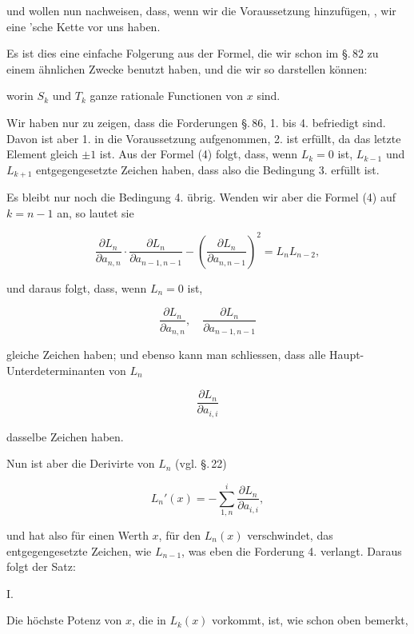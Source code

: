 und wollen nun nachweisen, dass, wenn wir die Voraussetzung hinzufügen, , wir eine 'sche Kette vor uns haben.

Es ist dies eine einfache Folgerung aus der Formel, die wir schon im \S.\,82 zu einem ähnlichen Zwecke benutzt haben, und die wir so darstellen können:


worin $S_k$ und $T_k$ ganze rationale Functionen von $x$ sind.

Wir haben nur zu zeigen, dass die Forderungen \S.\,86, 1. bis 4. befriedigt sind. Davon ist aber 1. in die Voraussetzung aufgenommen, 2. ist erfüllt, da das letzte Element gleich $\pm 1$ ist. Aus der Formel (4) folgt, dass, wenn $L_k=0$ ist, $L_{k-1}$ und $L_{k+1}$ entgegengesetzte Zeichen haben, dass also die Bedingung 3. erfüllt ist.

Es bleibt nur noch die Bedingung 4. übrig. Wenden wir aber die Formel (4) auf $k=n-1$ an, so lautet sie

\[
\frac{\partial L_n}{\partial a_{n,n}} \cdot \frac{\partial L_n}{\partial a_{n-1,n-1}} - \left(\frac{\partial L_n}{\partial a_{n,n-1}}\right)^2 = L_n L_{n-2},
\]

und daraus folgt, dass, wenn $L_n=0$ ist,

\[
\frac{\partial L_n}{\partial a_{n,n}}, \quad \frac{\partial L_n}{\partial a_{n-1,n-1}}
\]

gleiche Zeichen haben; und ebenso kann man schliessen, dass alle Haupt-Unterdeterminanten von $L_n$

\[
\frac{\partial L_n}{\partial a_{i,i}}
\]

dasselbe Zeichen haben.

Nun ist aber die Derivirte von $L_n$ (vgl. \S.\,22)

\[
L_n'(x) = -\sum_{1,n}^{i} \frac{\partial L_n}{\partial a_{i,i}},
\]

und hat also für einen Werth $x$, für den $L_n(x)$ verschwindet, das entgegengesetzte Zeichen, wie $L_{n-1}$, was eben die Forderung 4. verlangt. Daraus folgt der Satz:

I.\ 

Die höchste Potenz von $x$, die in $L_k(x)$ vorkommt, ist, wie schon oben bemerkt,
